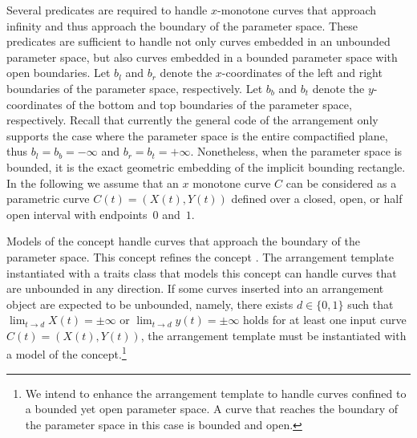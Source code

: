 Several predicates are required to handle $x$-monotone curves that
approach infinity and thus approach the boundary of the parameter
space. These predicates are sufficient to handle not only curves
embedded in an unbounded parameter space, but also curves embedded
in a bounded parameter space with open boundaries. Let $b_l$ and
$b_r$ denote the $x$-coordinates of the left and right boundaries of
the parameter space, respectively. Let $b_b$ and $b_t$ denote the
$y$-coordinates of the bottom and top boundaries of the parameter
space, respectively. Recall that currently the general code of the
arrangement only supports the case where the parameter space is the
entire compactified plane, thus $b_l = b_b = -\infty$ and
$b_r = b_t = +\infty$. Nonetheless, when the parameter space is
bounded, it is the exact geometric embedding of the implicit bounding
rectangle. In the following we assume that an $x$ monotone
curve $C$ can be considered as a parametric curve $C(t) = (X(t),Y(t))$
defined over a closed, open, or half open interval with endpoints~$0$
and~$1$.

Models of the concept  handle
curves that approach the boundary of the parameter space. This concept
refines the concept . The arrangement
template instantiated with a traits class that models this concept
can handle curves that are unbounded in any direction. If some curves
inserted into an arrangement object are expected to be unbounded, namely,
there exists $d \in \{0,1\}$ such that
$\lim_{t \rightarrow d}X(t) = \pm\infty$ or
$\lim_{t \rightarrow d}y(t) = \pm\infty$
holds for at least one input curve $C(t) = (X(t),Y(t))$, the arrangement
template must be instantiated with a model of the
 concept.\footnote{We
  intend to enhance the arrangement template to handle curves confined
  to a bounded yet open parameter space. A curve that reaches the
  boundary of the parameter space in this case is bounded and open.}

